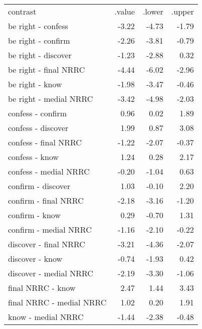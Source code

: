\begin{longtable}{lrrr}
 contrast & .value & .lower & .upper \\ 
 be right - confess & -3.22 & -4.73 & -1.79 \\ 
  be right - confirm & -2.26 & -3.81 & -0.79 \\ 
  be right - discover & -1.23 & -2.88 & 0.32 \\ 
  be right - final NRRC & -4.44 & -6.02 & -2.96 \\ 
  be right - know & -1.98 & -3.47 & -0.46 \\ 
  be right - medial NRRC & -3.42 & -4.98 & -2.03 \\ 
  confess - confirm & 0.96 & 0.02 & 1.89 \\ 
  confess - discover & 1.99 & 0.87 & 3.08 \\ 
  confess - final NRRC & -1.22 & -2.07 & -0.37 \\ 
  confess - know & 1.24 & 0.28 & 2.17 \\ 
  confess - medial NRRC & -0.20 & -1.04 & 0.63 \\ 
  confirm - discover & 1.03 & -0.10 & 2.20 \\ 
  confirm - final NRRC & -2.18 & -3.16 & -1.20 \\ 
  confirm - know & 0.29 & -0.70 & 1.31 \\ 
  confirm - medial NRRC & -1.16 & -2.10 & -0.22 \\ 
  discover - final NRRC & -3.21 & -4.36 & -2.07 \\ 
  discover - know & -0.74 & -1.93 & 0.42 \\ 
  discover - medial NRRC & -2.19 & -3.30 & -1.06 \\ 
  final NRRC - know & 2.47 & 1.44 & 3.43 \\ 
  final NRRC - medial NRRC & 1.02 & 0.20 & 1.91 \\ 
  know - medial NRRC & -1.44 & -2.38 & -0.48 \\ 
  \end{longtable}

